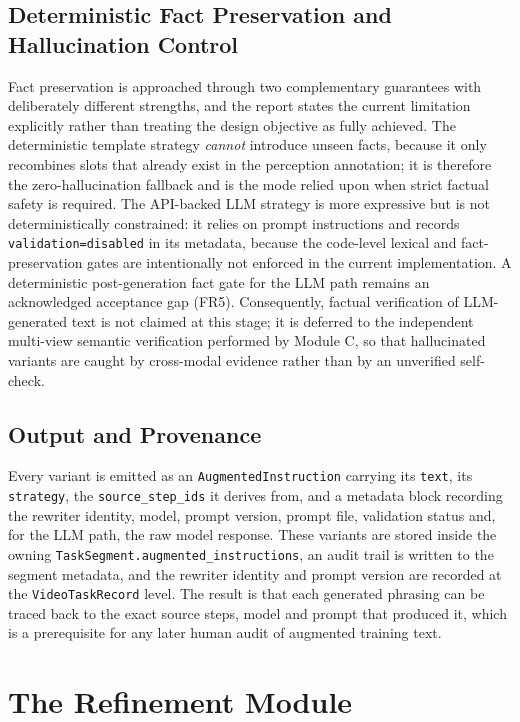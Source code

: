\documentclass[11pt,oneside]{report}
\begin{document}
\subsection{Deterministic Fact Preservation and Hallucination Control}
Fact preservation is approached through two complementary guarantees with
deliberately different strengths, and the report states the current limitation
explicitly rather than treating the design objective as fully achieved. The
deterministic template strategy \emph{cannot} introduce unseen facts, because it
only recombines slots that already exist in the perception annotation; it is
therefore the zero-hallucination fallback and is the mode relied upon when strict
factual safety is required. The API-backed LLM strategy is more expressive but is
not deterministically constrained: it relies on prompt instructions and records
\texttt{validation=disabled} in its metadata, because the code-level lexical and
fact-preservation gates are intentionally not enforced in the current
implementation. A deterministic post-generation fact gate for the LLM path
remains an acknowledged acceptance gap (FR5). Consequently, factual verification
of LLM-generated text is not claimed at this stage; it is deferred to the
independent multi-view semantic verification performed by Module C, so that
hallucinated variants are caught by cross-modal evidence rather than by an
unverified self-check.

\subsection{Output and Provenance}
Every variant is emitted as an \texttt{AugmentedInstruction} carrying its
\texttt{text}, its \texttt{strategy}, the \texttt{source\_step\_ids} it derives
from, and a metadata block recording the rewriter identity, model, prompt
version, prompt file, validation status and, for the LLM path, the raw model
response. These variants are stored inside the owning
\texttt{TaskSegment.augmented\_instructions}, an audit trail is written to the
segment metadata, and the rewriter identity and prompt version are recorded at
the \texttt{VideoTaskRecord} level. The result is that each generated phrasing can
be traced back to the exact source steps, model and prompt that produced it,
which is a prerequisite for any later human audit of augmented training text.

\section{The Refinement Module}
\end{document}
